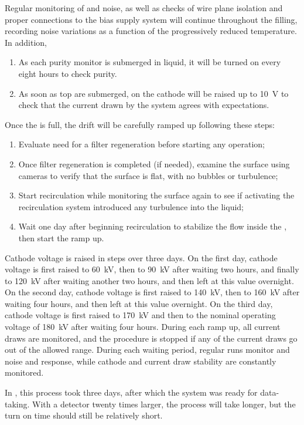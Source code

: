 Regular monitoring of  and  noise, as well as checks of wire plane isolation and proper connections to the bias supply system will continue throughout the filling, recording noise variations as a function of the progressively reduced temperature. In addition,

\begin{enumerate}

    \item As each purity monitor is submerged in liquid, it will be turned on every eight hours to check  purity. 
    
    \item As soon as top  are submerged,  on the cathode will be raised up to \SI{10}{V} to check that the current drawn by the system agrees with expectations.

\end{enumerate}

Once the  is full, the drift  will be carefully ramped up following these steps:

\begin{enumerate}

    \item Evaluate need for a filter regeneration before starting any operation;

    \item Once filter regeneration is completed (if needed), examine the  surface 
    using cameras to verify that the surface is flat, with no bubbles or turbulence;
    
    \item Start  recirculation while monitoring the  surface 
    again to see if activating the recirculation system introduced any turbulence into the liquid;
    
    \item Wait one day after beginning  recirculation to stabilize the  flow inside the , then start the  ramp up.
    
\end{enumerate}

Cathode voltage is raised in steps over three days. 
On the first day, cathode voltage is first raised to \SI{60}{kV}, then to \SI{90}{kV} after waiting two hours, and finally to \SI{120}{kV} after waiting another two hours, and then left at this value overnight.
On the second day, cathode voltage is first raised to \SI{140}{kV}, then to \SI{160}{kV} after waiting four hours, and then left at this value overnight. 
On the third day, cathode voltage is first raised to \SI{170}{kV} and then to the nominal operating voltage of \SI{180}{kV} after waiting four hours. 
During each  ramp up, all  current draws are monitored, and the procedure is stopped if any of the current draws go out of the allowed range. 
During each waiting period, regular  runs monitor  and  noise and response, while cathode  and current draw stability are constantly monitored.

In , this process took three days, after which the system was  ready for data-taking. With a detector twenty times larger, the process will take longer, but the turn on time should still be relatively short. 










